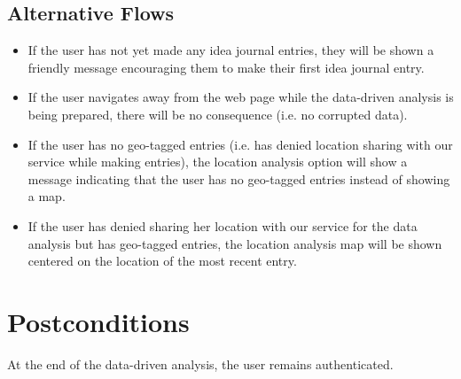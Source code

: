 \documentclass[a4paper]{article}
\begin{document}
    \subsection{Alternative Flows}
	\begin{itemize}
    	\item If the user has not yet made any idea journal entries, they will be shown a friendly message encouraging them to make their first idea journal entry.
        \item If the user navigates away from the web page while the data-driven analysis is being prepared, there will be no consequence (i.e. no corrupted data). 
        \item If the user has no geo-tagged entries (i.e. has denied location sharing with our service while making entries), the location analysis option will show a message indicating that the user has no geo-tagged entries instead of showing a map.
        \item If the user has denied sharing her location with our service for the data analysis but has geo-tagged entries, the location analysis map will be shown centered on the location of the most recent entry.
    \end{itemize}
\section{Postconditions}
At the end of the data-driven analysis, the user remains authenticated.
\end{document}

